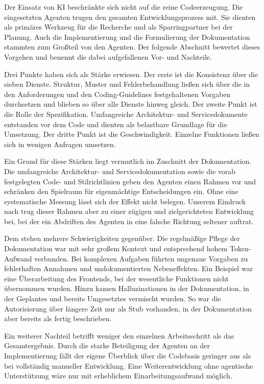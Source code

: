 Der Einsatz von KI beschränkte sich nicht auf die reine Codeerzeugung. Die eingesetzten Agenten trugen den gesamten Entwicklungsprozess mit. Sie dienten als primäres Werkzeug für die Recherche und als Sparringpartner bei der Planung. Auch die Implementierung und die Formulierung der Dokumentation stammten zum Großteil von den Agenten. Der folgende Abschnitt bewertet dieses Vorgehen und benennt die dabei aufgefallenen Vor- und Nachteile.

Drei Punkte haben sich als Stärke erwiesen. Der erste ist die Konsistenz über die sieben Dienste. Struktur, Muster und Fehlerbehandlung ließen sich über die in den Anforderungen und den Coding-Guidelines festgehaltenen Vorgaben durchsetzen und blieben so über alle Dienste hinweg gleich. Der zweite Punkt ist die Rolle der Spezifikation. Umfangreiche Architektur- und Servicedokumente entstanden vor dem Code und dienten als belastbare Grundlage für die Umsetzung. Der dritte Punkt ist die Geschwindigkeit. Einzelne Funktionen ließen sich in wenigen Anfragen umsetzen.

Ein Grund für diese Stärken liegt vermutlich im Zuschnitt der Dokumentation. Die umfangreiche Architektur- und Servicedokumentation sowie die vorab festgelegten Code- und Stilrichtlinien geben den Agenten einen Rahmen vor und schränken den Spielraum für eigenmächtige Entscheidungen ein. Ohne eine systematische Messung lässt sich der Effekt nicht belegen. Unserem Eindruck nach trug dieser Rahmen aber zu einer zügigen und zielgerichteten Entwicklung bei, bei der ein Abdriften des Agenten in eine falsche Richtung seltener auftrat.

Dem stehen mehrere Schwierigkeiten gegenüber. Die regelmäßige Pflege der Dokumentation war mit sehr großem Kontext und entsprechend hohem Token-Aufwand verbunden. Bei komplexen Aufgaben führten ungenaue Vorgaben zu fehlerhaften Annahmen und undokumentierten Nebeneffekten. Ein Beispiel war eine Überarbeitung des Frontends, bei der wesentliche Funktionen nicht übernommen wurden. Hinzu kamen Halluzinationen in der Dokumentation, in der Geplantes und bereits Umgesetztes vermischt wurden. So war die Autorisierung über längere Zeit nur als Stub vorhanden, in der Dokumentation aber bereits als fertig beschrieben.

Ein weiterer Nachteil betrifft weniger den einzelnen Arbeitsschritt als das Gesamtergebnis. Durch die starke Beteiligung der Agenten an der Implementierung fällt der eigene Überblick über die Codebasis geringer aus als bei vollständig manueller Entwicklung. Eine Weiterentwicklung ohne agentische Unterstützung wäre nur mit erheblichem Einarbeitungsaufwand möglich.

